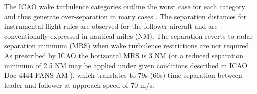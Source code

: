 The ICAO wake turbulence categories outline the worst case for each category and thus generate over-separation in many cases \cite{noauthor_recat_2018}. The separation distances for instrumental flight rules are observed for the follower aircraft and are conventionally expressed in nautical miles (NM). The separation reverts to radar separation minimum (MRS) when wake turbulence restrictions are not required. As  prescribed  by  ICAO  the  horizontal MRS is 3 NM (or a reduced separation minimum of 2.5 NM may be applied under given conditions described in ICAO Doc 4444 PANS-AM \cite{doc44444}), which translates to 79s (66s) time separation between leader and follower at approach speed of 70 m/s.


\begin{table}[]
\centering
{}
\caption[ICAO wake turbulence categories and separation minima]{ICAO wake turbulence categories and separation minima to avoid wake vortex encounter. \cite{noauthor_recat_2018, rooseleer2015recat}} \label{tab:ICAO_WTC}
\end{table}




